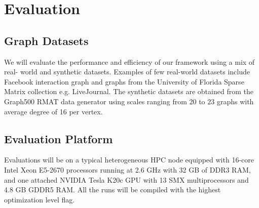 \section{Evaluation}
\subsection{Graph Datasets}
We will evaluate the performance and efficiency of our framework using a mix of real- world and synthetic datasets. Examples of few real-world datasets include Facebook interaction graph and graphs from the University of Florida Sparse Matrix collection e.g. LiveJournal. The synthetic datasets are obtained from the Graph500 RMAT data generator using scales ranging from 20 to 23 graphs with average degree of 16 per vertex.

\subsection{Evaluation Platform}
Evaluations will be on a typical heterogeneous HPC node equipped with 16-core Intel Xeon E5-2670 processors running at 2.6 GHz with 32 GB of DDR3 RAM, and one attached NVIDIA Tesla K20c GPU with 13 SMX multiprocessors and 4.8 GB GDDR5 RAM. All the runs will be compiled with the highest optimization level flag.

\label{evaluation}

